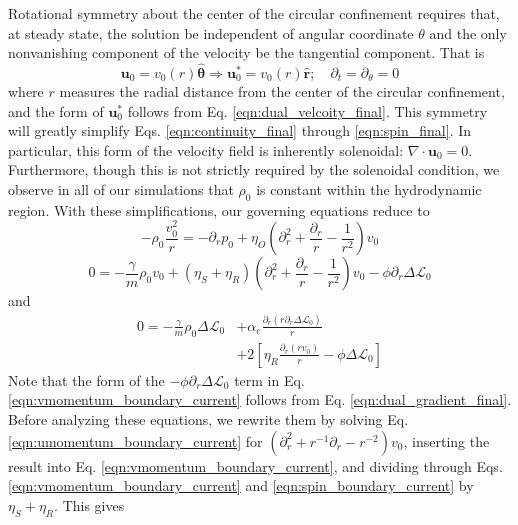 \documentclass[%
 reprint,
superscriptaddress,
longbibliography,
 amsmath,amssymb,
 prl,
 citeautoscript,
]{revtex4-1}
\begin{document}
Rotational symmetry about the center of the circular confinement requires that, at steady state, the solution be independent of angular coordinate $\theta$ and the only nonvanishing component of the velocity be the tangential component. That is
\begin{equation}
{\boldsymbol u}_0 = v_0 (r) \hat{\boldsymbol \theta} \Longrightarrow {\boldsymbol u}_0^* = v_0 (r) \hat{\boldsymbol r}; \quad \partial_t = \partial_{\theta} = 0
\label{eqn:boundary_current_symmetry}
\end{equation}
where $r$ measures the radial distance from the center of the circular confinement, and the form of ${\boldsymbol u}_0^*$ follows from Eq. \ref{eqn:dual_velcoity_final}. This symmetry will greatly simplify Eqs. \ref{eqn:continuity_final} through \ref{eqn:spin_final}. In particular, this form of the velocity field is inherently solenoidal: $\nabla \cdot {\boldsymbol u}_0 = 0$. Furthermore, though this is not strictly required by the solenoidal condition, we observe in all of our simulations that $\rho_0$ is constant within the hydrodynamic region. With these simplifications, our governing equations reduce to
\begin{equation}
- \rho_0 \frac{v_0^2}{r} = - \partial_r p_0 + \eta_O \left( \partial_r^2 + \frac{\partial_r}{r} - \frac{1}{r^2} \right) v_0
\label{eqn:umomentum_boundary_current}
\end{equation}
\begin{equation}
0 = - \frac{\gamma}{m} \rho_0 v_0 + \left( \eta_S + \eta_R \right) \left( \partial_r^2 + \frac{\partial_r}{r} - \frac{1}{r^2} \right) v_0 - \phi \partial_r \Delta \mathcal{L}_0
\label{eqn:vmomentum_boundary_current}
\end{equation}
and
\begin{equation}
\begin{split}
0 = - \frac{\gamma}{m} \rho_0 \Delta \mathcal{L}_0 &+ \alpha_e \frac{\partial_r \left( r \partial_r \Delta \mathcal{L}_0 \right)}{r} \\
&+ 2 \left[ \eta_R \frac{\partial_r \left( r v_0 \right)}{r} - \phi \Delta \mathcal{L}_0 \right]
\end{split}
\label{eqn:spin_boundary_current}
\end{equation}
Note that the form of the $-\phi \partial_r \Delta \mathcal{L}_0$ term in Eq. \ref{eqn:vmomentum_boundary_current} follows from Eq. \ref{eqn:dual_gradient_final}. Before analyzing these equations, we rewrite them by solving Eq. \ref{eqn:umomentum_boundary_current} for $\left( \partial_r^2 + r^{-1} \partial_r - r^{-2} \right) v_0$, inserting the result into Eq. \ref{eqn:vmomentum_boundary_current}, and dividing through Eqs. \ref{eqn:vmomentum_boundary_current} and \ref{eqn:spin_boundary_current} by $\eta_S + \eta_R$. This gives
\end{document}
